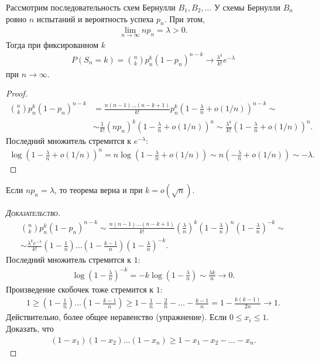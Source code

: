 \begin{thm}[%
 Пуассона]
 \label{theorem:poisson}
 Рассмотрим последовательность схем Бернулли $B_1, B_2, \ldots$ У схемы Бернулли $B_n$ ровно $n$ испытаний и вероятность успеха $p_n$. При этом,
 \begin{align*}
  \lim_{n \to \infty} np_n = \lambda > 0 
 .\end{align*} Тогда при фиксированном $k$
 \begin{align*}
  P(S_n = k) = \binom n k p_n^{k} (1-p_n)^{n-k} \to \frac{\lambda^{k}}{k!} e^{-\lambda}
 \end{align*} при $n \to \infty$.
\end{thm}
\begin{proof}
 \begin{align*}
  \binom n k p_n^{k}(1-p_n)^{n-k} &= \frac{n(n-1)\ldots(n-k+1)}{k!} p_n^{k} \left(1 - \frac{\lambda}{n} + o (1 / n)\right)^{n-k} \sim \\
  & \sim \frac{1}{k!}(np_n)^{k} \left( 1 - \frac{\lambda}{n} + o(1 / n) \right)^{n} \sim \frac{\lambda^{k}}{k!} \left( 1 - \frac{\lambda}{n} + o(1 / n) \right)^{n}
 .\end{align*}  Последний множитель стремится к $e^{-\lambda}$:
 \begin{align*}
  \log \left( 1 - \frac{\lambda}{n} + o(1 / n) \right)^{n} = n \log \left( 1 - \frac{\lambda}{n} + o(1 / n) \right) \sim n \left( - \frac{\lambda}{n} + o(1 / n) \right) \sim -\lambda
 .\end{align*} 
\end{proof}

\begin{remrk*}
 Если $np_n = \lambda$, то теорема верна и при $k = o(\sqrt{n})$.
\end{remrk*}
\begin{proof}[\normalfont\textsc{Доказательство}]
 \begin{align*}
  \binom n k p_n^{k} (1-p_n)^{n-k} \sim \frac{n(n-1)\ldots(n-k+1)}{k!} \left( \frac{\lambda}{n} \right)^{k}\left(1 - \frac{\lambda}{n}\right)^{n} \left( 1 - \frac{\lambda}{n} \right)^{-k} \sim \\
  \sim \frac{\lambda^{k}e^{-\lambda}}{k!} \left( 1 - \frac{1}{n} \right) \ldots \left(1 - \frac{k - 1}{n}\right) \left( 1 - \frac{\lambda}{n} \right)^{-k}
 .\end{align*} Последний множитель стремится к $1$:
 \begin{align*}
  \log \left( 1 - \frac{\lambda}{n} \right)^{-k} = -k \log \left( 1 - \frac{\lambda}{n} \right) \sim \frac{\lambda k}{n} \to 0
 .\end{align*} Произведение скобочек тоже стремится к $1$:
 \begin{align*}
  1 \geqslant \left( 1 - \frac{1}{n} \right) \ldots \left( 1 - \frac{k-1}{n} \right) \geqslant 1 - \frac{1}{n} - \frac{2}{n} - \ldots - \frac{k - 1}{n} = 1- \frac{k(k-1)}{2n} \to 1
 .\end{align*} Действительно, более общее неравенство (упражнение). Если $0 \leqslant x_i \leqslant 1$. Доказать, что
 \begin{align*}
  (1 - x_1)(1 - x_2) \ldots (1-x_n) \geqslant 1 - x_1 - x_2 - \ldots - x_n
 .\end{align*} 
\end{proof}

